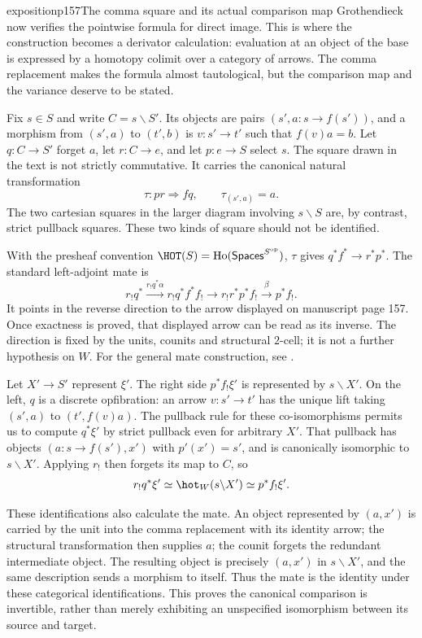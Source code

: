 \begin{dcomment}{exposition}{p157}{The comma square and its actual comparison map}
Grothendieck now verifies the pointwise formula for direct image. This is where the construction becomes a derivator calculation: evaluation at an object of the base is expressed by a homotopy colimit over a category of arrows. The comma replacement makes the formula almost tautological, but the comparison map and the variance deserve to be stated.

Fix $s\in S$ and write $C=s\backslash S'$. Its objects are pairs $(s',a:s\longrightarrow f(s'))$, and a morphism from $(s',a)$ to $(t',b)$ is $v:s'\longrightarrow t'$ such that $f(v)a=b$. Let $q:C\longrightarrow S'$ forget $a$, let $r:C\longrightarrow e$, and let $p:e\longrightarrow S$ select $s$. The square drawn in the text is not strictly commutative. It carries the canonical natural transformation
\[
 \tau:pr\Longrightarrow fq,
 \qquad \tau_{(s',a)}=a.
\]
The two cartesian squares in the larger diagram involving $s\backslash S$ are, by contrast, strict pullback squares. These two kinds of square should not be identified.

With the presheaf convention $\HOT(S)=\operatorname{Ho}(\mathsf{Spaces}^{S^{\mathrm{op}}})$, $\tau$ gives $q^*f^*\longrightarrow r^*p^*$. The standard left-adjoint mate is
\[
 r_!q^*\xrightarrow{r_!q^*\alpha}
 r_!q^*f^*f_!\longrightarrow
 r_!r^*p^*f_!\xrightarrow{\beta}
 p^*f_!.
\]
It points in the reverse direction to the arrow displayed on manuscript page 157. Once exactness is proved, that displayed arrow can be read as its inverse. The direction is fixed by the units, counits and structural $2$-cell; it is not a further hypothesis on $W$. For the general mate construction, see \citet[Proposition~4.3.8]{Riehl2016}.

Let $X'\longrightarrow S'$ represent $\xi'$. The right side $p^*f_!\xi'$ is represented by $s\backslash X'$. On the left, $q$ is a discrete opfibration: an arrow $v:s'\longrightarrow t'$ has the unique lift taking $(s',a)$ to $(t',f(v)a)$. The pullback rule for these co-isomorphisms permits us to compute $q^*\xi'$ by strict pullback even for arbitrary $X'$. That pullback has objects $(a:s\longrightarrow f(s'),x')$ with $p'(x')=s'$, and is canonically isomorphic to $s\backslash X'$. Applying $r_!$ then forgets its map to $C$, so
\[
 r_!q^*\xi'\simeq\hot_W(s\backslash X')
 \simeq p^*f_!\xi'.
\]

These identifications also calculate the mate. An object represented by $(a,x')$ is carried by the unit into the comma replacement with its identity arrow; the structural transformation then supplies $a$; the counit forgets the redundant intermediate object. The resulting object is precisely $(a,x')$ in $s\backslash X'$, and the same description sends a morphism to itself. Thus the mate is the identity under these categorical identifications. This proves the canonical comparison is invertible, rather than merely exhibiting an unspecified isomorphism between its source and target.


\end{dcomment}

